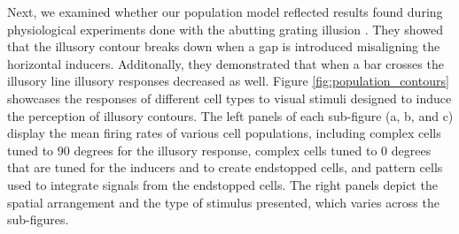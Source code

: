 \documentclass[12pt]{article}
\begin{document}
Next, we examined whether our population model reflected results found during physiological experiments done with the abutting grating illusion \autocite{vonderheydtMechanismsContourPerception1989}. They showed that the illusory contour breaks down when a gap is introduced misaligning the horizontal inducers. Additonally, they demonstrated that when a bar crosses the illusory line illusory responses decreased as well. Figure \ref{fig:population_contours} showcases the responses of different cell types to visual stimuli designed to induce the perception of illusory contours. The left panels of each sub-figure (a, b, and c) display the mean firing rates of various cell populations, including complex cells tuned to 90 degrees for the illusory response, complex cells tuned to 0 degrees that are tuned for the inducers and to create endstopped cells, and pattern cells used to integrate signals from the endstopped cells. The right panels depict the spatial arrangement and the type of stimulus presented, which varies across the sub-figures.
\bigbreak
\end{document}

